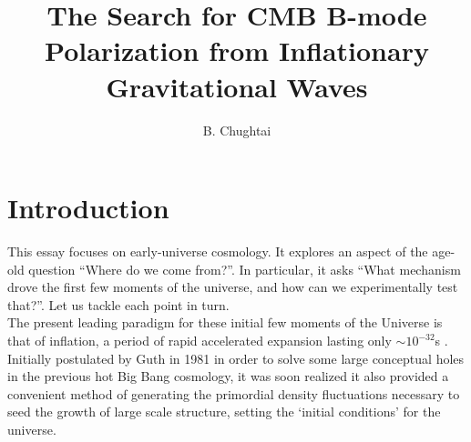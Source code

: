 \documentclass[a4paper,10pt]{article}
\title{\boldmath The Search for CMB B-mode Polarization from Inflationary Gravitational Waves}
\author{B. Chughtai}
\affiliation{University of Cambridge, Cambridge, UK}
\begin{document}
\maketitle
\flushbottom





\section{Introduction}


This essay focuses on early-universe cosmology. It explores an aspect of the age-old question ``Where do we come from?''. In particular, it asks ``What mechanism drove the first few moments of the universe, and how can we experimentally test that?''. Let us tackle each point in turn.\\

The present leading paradigm for these initial few moments of the Universe is that of inflation, a period of rapid accelerated expansion lasting only $\sim10^{-32}$s . Initially postulated by Guth in 1981 \cite{Guth} in order to solve some large conceptual holes in the previous hot Big Bang cosmology, it was soon realized it also provided a convenient method of generating the primordial density fluctuations necessary to seed the growth of large scale structure, setting the `initial conditions' for the universe. \\
\end{document}
